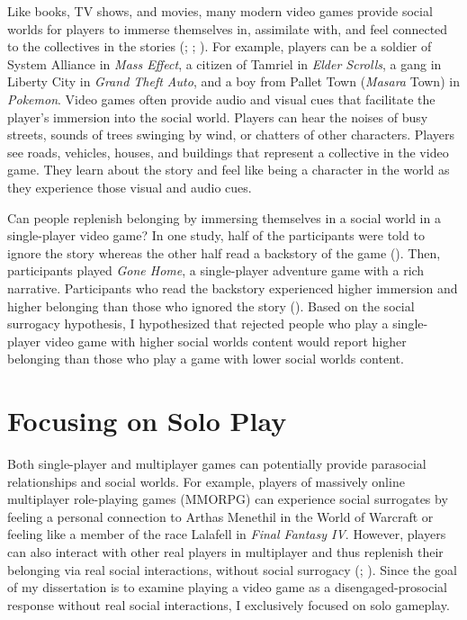 \documentclass[
]{udthesis}
\begin{document}
Like books, TV shows, and movies, many modern video games provide social
worlds for players to immerse themselves in, assimilate with, and feel
connected to the collectives in the stories
(; ; ).
For example, players can be a soldier of System Alliance in \emph{Mass
Effect}, a citizen of Tamriel in \emph{Elder Scrolls}, a gang in Liberty City
in \emph{Grand Theft Auto}, and a boy from Pallet Town (\emph{Masara} Town) in
\emph{Pokemon}. Video games often provide audio and visual cues that
facilitate the player's immersion into the social world. Players can
hear the noises of busy streets, sounds of trees swinging by wind, or
chatters of other characters. Players see roads, vehicles, houses, and
buildings that represent a collective in the video game. They learn
about the story and feel like being a character in the world as they
experience those visual and audio cues.

Can people replenish belonging by immersing themselves in a social world in a
single-player video game? In one study, half of the participants were
told to ignore the story whereas the other half read a backstory of the
game (). Then, participants played
\emph{Gone Home}, a single-player adventure game with a rich narrative.
Participants who read the backstory experienced higher immersion and
higher belonging than those who ignored the story
(). Based on the social surrogacy
hypothesis, I hypothesized that rejected people who play a single-player
video game with higher social worlds content would report higher
belonging than those who play a game with lower social worlds content.

\section{Focusing on Solo Play}\label{focusing-on-solo-play}

Both single-player and multiplayer games can potentially provide
parasocial relationships and social worlds. For example, players of
massively online multiplayer role-playing games (MMORPG) can experience
social surrogates by feeling a personal connection to Arthas Menethil in
the World of Warcraft or feeling like a member of the race Lalafell in
\emph{Final Fantasy IV}. However, players can also interact with other real
players in multiplayer and thus replenish their belonging via real
social interactions, without social surrogacy (; ).
Since the goal of my dissertation is to examine playing a video game as
a disengaged-prosocial response without real social interactions, I
exclusively focused on solo gameplay.
\end{document}
